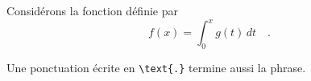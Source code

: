 Considérons la fonction définie par
\[
  f(x) = \int_0^x g(t) \, dt \quad \text{.}
\]
\begin{proposition}
  Une ponctuation écrite en \verb|\text{.}| termine aussi la phrase.
\end{proposition}
